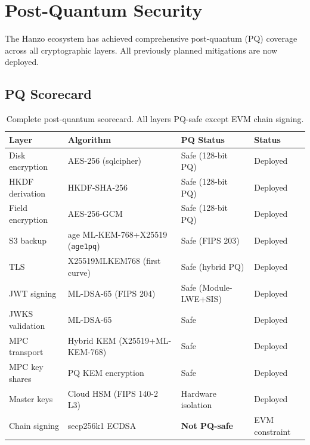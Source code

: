 \documentclass[11pt]{article}
\begin{document}
\section{Post-Quantum Security}

The Hanzo ecosystem has achieved comprehensive post-quantum (PQ)
coverage across all cryptographic layers. All previously planned
mitigations are now deployed.

\subsection{PQ Scorecard}

\begin{table}[H]
\centering
\begin{tabular}{@{}llll@{}}
\toprule
\textbf{Layer} & \textbf{Algorithm} & \textbf{PQ Status} & \textbf{Status} \\
\midrule
Disk encryption     & AES-256 (sqlcipher)          & Safe (128-bit PQ)    & Deployed \\
HKDF derivation     & HKDF-SHA-256                 & Safe (128-bit PQ)    & Deployed \\
Field encryption    & AES-256-GCM                  & Safe (128-bit PQ)    & Deployed \\
S3 backup           & age ML-KEM-768+X25519 (\texttt{age1pq}) & Safe (FIPS 203) & Deployed \\
TLS                 & X25519MLKEM768 (first curve) & Safe (hybrid PQ)     & Deployed \\
JWT signing         & ML-DSA-65 (FIPS 204)         & Safe (Module-LWE+SIS)& Deployed \\
JWKS validation     & ML-DSA-65                    & Safe                 & Deployed \\
MPC transport       & Hybrid KEM (X25519+ML-KEM-768) & Safe              & Deployed \\
MPC key shares      & PQ KEM encryption            & Safe                 & Deployed \\
Master keys         & Cloud HSM (FIPS 140-2 L3)    & Hardware isolation   & Deployed \\
Chain signing       & secp256k1 ECDSA              & \textbf{Not PQ-safe} & EVM constraint \\
\bottomrule
\end{tabular}
\caption{Complete post-quantum scorecard. All layers PQ-safe except EVM chain signing.}
\label{tab:pq-scorecard}
\end{table}
\end{document}
